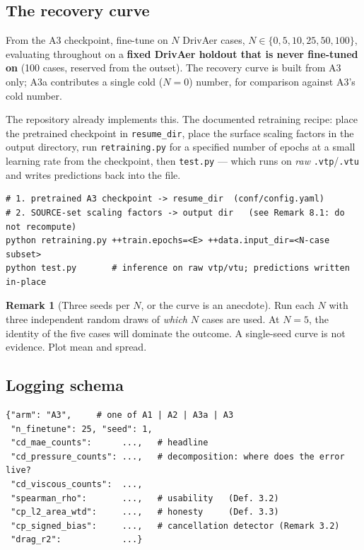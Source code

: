\documentclass[10pt,a4paper]{article}
\theoremstyle{definition}
\newtheorem{remark}{Remark}[section]
\begin{document}
\subsection{The recovery curve}

From the A3 checkpoint, fine-tune on $N$ DrivAer cases, $N \in \{0,5,10,25,50,100\}$,
evaluating throughout on a \textbf{fixed DrivAer holdout that is never fine-tuned on}
(100 cases, reserved from the outset). The recovery curve is built from A3 only; A3a
contributes a single cold ($N{=}0$) number, for comparison against A3's cold number.

The repository already implements this. The documented retraining recipe: place the
pretrained checkpoint in \texttt{resume\_dir}, place the surface scaling factors in
the output directory, run \texttt{retraining.py} for a specified number of epochs at
a small learning rate from the checkpoint, then \texttt{test.py} --- which runs on
\emph{raw} \texttt{.vtp}/\texttt{.vtu} and writes predictions back into the file.

\begin{lstlisting}[style=sh]
# 1. pretrained A3 checkpoint -> resume_dir  (conf/config.yaml)
# 2. SOURCE-set scaling factors -> output dir   (see Remark 8.1: do not recompute)
python retraining.py ++train.epochs=<E> ++data.input_dir=<N-case subset>
python test.py       # inference on raw vtp/vtu; predictions written in-place
\end{lstlisting}

\begin{remark}[Three seeds per $N$, or the curve is an anecdote]
Run each $N$ with three independent random draws of \emph{which} $N$ cases are used.
At $N=5$, the identity of the five cases will dominate the outcome. A single-seed
curve is not evidence. Plot mean and spread.
\end{remark}

\subsection{Logging schema}

\begin{lstlisting}
{"arm": "A3",     # one of A1 | A2 | A3a | A3
 "n_finetune": 25, "seed": 1,
 "cd_mae_counts":      ...,   # headline
 "cd_pressure_counts": ...,   # decomposition: where does the error live?
 "cd_viscous_counts":  ...,
 "spearman_rho":       ...,   # usability   (Def. 3.2)
 "cp_l2_area_wtd":     ...,   # honesty     (Def. 3.3)
 "cp_signed_bias":     ...,   # cancellation detector (Remark 3.2)
 "drag_r2":            ...}
\end{lstlisting}
\end{document}
